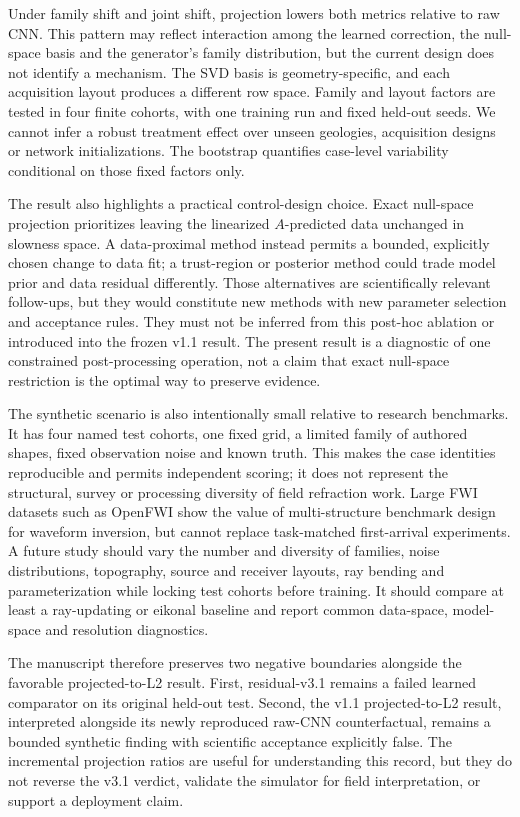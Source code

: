 \documentclass[11pt]{article}
\begin{document}
Under family shift and joint shift, projection lowers both metrics relative to raw CNN. This pattern may reflect interaction among the learned correction, the null-space basis and the generator's family distribution, but the current design does not identify a mechanism. The SVD basis is geometry-specific, and each acquisition layout produces a different row space. Family and layout factors are tested in four finite cohorts, with one training run and fixed held-out seeds. We cannot infer a robust treatment effect over unseen geologies, acquisition designs or network initializations. The bootstrap quantifies case-level variability conditional on those fixed factors only.

The result also highlights a practical control-design choice. Exact null-space projection prioritizes leaving the linearized $A$-predicted data unchanged in slowness space. A data-proximal method instead permits a bounded, explicitly chosen change to data fit; a trust-region or posterior method could trade model prior and data residual differently. Those alternatives are scientifically relevant follow-ups, but they would constitute new methods with new parameter selection and acceptance rules. They must not be inferred from this post-hoc ablation or introduced into the frozen v1.1 result. The present result is a diagnostic of one constrained post-processing operation, not a claim that exact null-space restriction is the optimal way to preserve evidence.

The synthetic scenario is also intentionally small relative to research benchmarks. It has four named test cohorts, one fixed grid, a limited family of authored shapes, fixed observation noise and known truth. This makes the case identities reproducible and permits independent scoring; it does not represent the structural, survey or processing diversity of field refraction work. Large FWI datasets such as OpenFWI show the value of multi-structure benchmark design for waveform inversion, but cannot replace task-matched first-arrival experiments. A future study should vary the number and diversity of families, noise distributions, topography, source and receiver layouts, ray bending and parameterization while locking test cohorts before training. It should compare at least a ray-updating or eikonal baseline and report common data-space, model-space and resolution diagnostics.

The manuscript therefore preserves two negative boundaries alongside the favorable projected-to-L2 result. First, residual-v3.1 remains a failed learned comparator on its original held-out test. Second, the v1.1 projected-to-L2 result, interpreted alongside its newly reproduced raw-CNN counterfactual, remains a bounded synthetic finding with scientific acceptance explicitly false. The incremental projection ratios are useful for understanding this record, but they do not reverse the v3.1 verdict, validate the simulator for field interpretation, or support a deployment claim.
\end{document}

